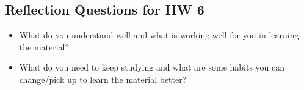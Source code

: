 \subsection*{Reflection Questions for HW 6}
    \begin{itemize}
        \item What do you understand well and what is working well for you in learning the material?


        \item What do you need to keep studying and what are some habits you can change/pick up to learn the material better?

    \end{itemize}
